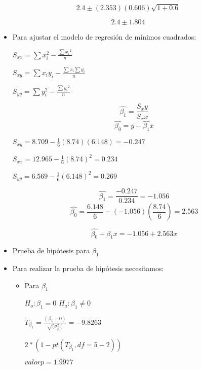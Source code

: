 \documentclass{../oxmathproblems}
\begin{document}
\begin{questions}
\begin{itemize}

$$ 2.4 \pm (2.353)(0.606)\sqrt{1+0.6} $$ 

$$ 2.4 \pm 1.804 $$ 
\end{itemize}

\miquestion 
\begin{itemize}
\item Para ajustar el modelo de regresión de mínimos cuadrados: 

$ S_{xx} = \sum{x_i^2} - \frac{\sum{x_i}^2}{n}$  

$ S_{xy} = \sum{x_iy_i} - \frac{\sum{x_i}\sum{y_i}}{n} $

$ S_{yy} = \sum{y_i^2} - \frac{\sum{y_i}^2}{n}$  

$$ \hat{\beta_1} = \frac{S_xy}{S_xx} $$ 
$$ \hat{\beta_0} = \bar{y} -\hat{\beta_1}\bar{x}  $$


$ S_{xy} = 8.709 - \frac{1}{6}(8.74)(6.148) = - 0.247 $ 

$ S_{xx} = 12.965 - \frac{1}{6}(8.74)^2 = 0.234 $ 

$ S_{yy} = 6.569 - \frac{1}{6}(6.148)^2 = 0.269 $ 

$$ \hat{\beta_1} = \frac{- 0.247}{0.234} = -1.056  $$ 
$$ \hat{\beta_0} =\frac{6.148}{6} - (-1.056)(\frac{8.74}{6}) = 2.563 $$ 


$$ \hat{\beta_0} + \hat{\beta_1}x =  -1.056 + 2.563x $$  

\item Prueba de hipótesis para $\beta_1$ 

\item Para realizar la prueba de hipótesis necesitamos: 
\begin{itemize}
\item Para $\beta_1$ 


$ H_o:\beta_1 = 0 $  $ H_a:\beta_1 \neq 0 $ 



$ T_{\beta_1}= \frac{(\beta{_1}-0)}{\sqrt(\sigma^2_{\beta_1})} =  -9.8263 $ 


$ 2*(1-pt(T_{\beta_1}, df = 5-2)) $ 


$ valor p = 1.9977 $ 

\end{itemize}


\end{itemize}
\end{questions}
\end{document}
